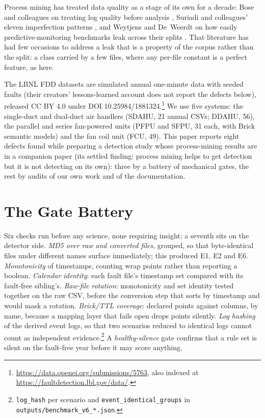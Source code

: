 \documentclass[runningheads]{llncs}
\begin{document}
Process mining has treated data quality as a stage of its own for a decade: Bose and colleagues on treating log quality before analysis \cite{bose2013dataquality}, Suriadi and colleagues' eleven imperfection patterns \cite{suriadi2017imperfection}, and Weytjens and De~Weerdt on how easily predictive-monitoring benchmarks leak across their splits \cite{weytjens2022dataleakage}. That literature has had few occasions to address a leak that is a property of the corpus rather than the split: a class carried by a few files, where any per-file constant is a perfect feature, as here.

The LBNL FDD datasets \cite{granderson2020lbnlfdddata,granderson2023lbnlfdddata} are simulated annual one-minute data with seeded faults (their creators' lessons-learned account \cite{casillas2024ahufaultmodels} does not report the defects below), released CC BY 4.0 under DOI 10.25984/1881324.\footnote{\url{https://data.openei.org/submissions/5763}, also indexed at \url{https://faultdetection.lbl.gov/data/}.} We use five systems: the single-duct and dual-duct air handlers (SDAHU, 21 annual CSVs; DDAHU, 56), the parallel and series fan-powered units (PFPU and SFPU, 31 each, with Brick semantic models) and the fan coil unit (FCU, 49). This paper reports eight defects found while preparing a detection study whose process-mining results are in a companion paper \cite{singh2027erpmcompanion} (its settled finding: process mining helps to get detection but it is not detecting on its own): three by a battery of mechanical gates, the rest by audits of our own work and of the documentation.

\section{The Gate Battery}
\label{sec:gates}

Six checks run before any science, none requiring insight; a seventh sits on the detector side. \emph{MD5 over raw and converted files}, grouped, so that byte-identical files under different names surface immediately; this produced E1, E2 and E6. \emph{Monotonicity} of timestamps, counting wrap points rather than reporting a boolean. \emph{Calendar identity}: each fault file's timestamp set compared with its fault-free sibling's. \emph{Raw-file rotation}: monotonicity and set identity tested together on the raw CSV, before the conversion step that sorts by timestamp and would mask a rotation. \emph{Brick/TTL coverage}: declared points against columns, by name, because a mapping layer that fails open drops points silently. \emph{Log hashing} of the derived event logs, so that two scenarios reduced to identical logs cannot count as independent evidence.\footnote{\texttt{log\_hash} per scenario and \texttt{event\_identical\_groups} in \texttt{outputs/benchmark\_v6\_*.json}.} A \emph{healthy-silence} gate confirms that a rule set is silent on the fault-free year before it may score anything.
\end{document}
